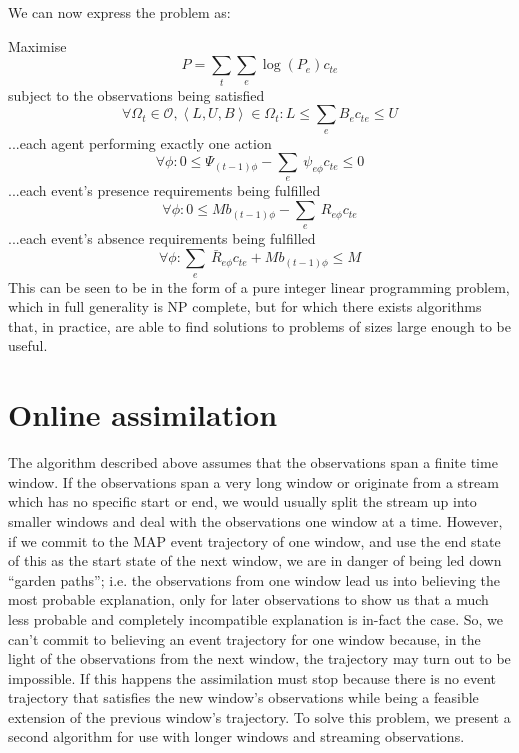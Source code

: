 \documentclass[sigconf]{aamas}
\begin{document}
We can now express the problem as:

Maximise
\begin{equation}
P = \sum_t\sum_e \log(P_e)c_{te}
\end{equation}
subject to the observations being satisfied
\begin{equation}
\forall \Omega_t \in \mathcal{O}, \left<L,U,B\right> \in \Omega_t: L \le \sum_e B_e c_{te} \le U
\label{observation}
\end{equation}
...each agent performing exactly one action
\begin{equation}
\forall\phi: 0 \le \Psi_{(t-1)\phi} -  \sum_e\ \psi_{e\phi} c_{te} \le 0
\label{IPagency}
\end{equation}
...each event's presence requirements being fulfilled
\begin{equation}
\forall\phi: 0 \le Mb_{(t-1)\phi} - \sum_e\ R_{e\phi} c_{te} 
\end{equation}
...each event's absence requirements being fulfilled
\begin{equation}
\forall\phi: \sum_e\ \bar{R}_{e\phi} c_{te} + Mb_{(t-1)\phi} \le M
\label{absenceConstraint}
\end{equation}
This can be seen to be in the form of a pure integer linear programming problem, which in full generality is NP complete, but for which there exists algorithms that, in practice, are able to find solutions to problems of sizes large enough to be useful.


\section{Online assimilation}

The algorithm described above assumes that the observations span a finite time window. If the observations span a very long window or originate from a stream which has no specific start or end, we would usually split the stream up into smaller windows and deal with the observations one window at a time. However, if we commit to the MAP event trajectory of one window, and use the end state of this as the start state of the next window, we are in danger of being led down ``garden paths''; i.e. the observations from one window lead us into believing the most probable explanation, only for later observations to show us that a much less probable and completely incompatible explanation is in-fact the case. So, we can't commit to believing an event trajectory for one window because, in the light of the observations from the next window, the trajectory may turn out to be impossible. If this happens the assimilation must stop because there is no event trajectory that satisfies the new window's observations while being a feasible extension of the previous window's trajectory. To solve this problem, we present a second algorithm for use with longer windows and streaming observations.
\end{document}
